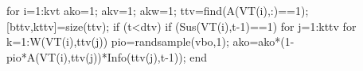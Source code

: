                                     for i=1:kvt   
                                          ako=1;
                                          akv=1;
                                          akw=1;
                                          ttv=find(A(VT(i),:)==1);    
                                          [bttv,kttv]=size(ttv);
                                          if (t<dtv)
                                                            if (Sus(VT(i),t-1)==1)
                                                                    for j=1:kttv                                                                                                  
                                                                            for k=1:W(VT(i),ttv(j))                                                                                                                                           
                                                                                pio=randsample(vbo,1);                                     
                                                                                ako=ako*(1-pio*A(VT(i),ttv(j))*Info(ttv(j),t-1));                                                                                                        
                                                                            end
                                                          
